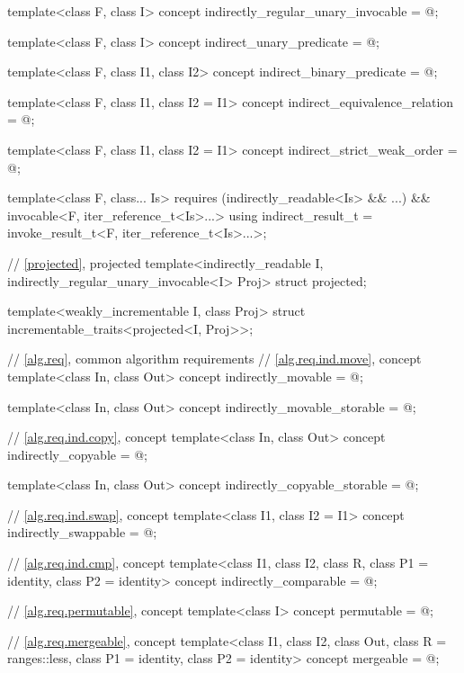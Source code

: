 \begin{codeblock}
{  template<class F, class I>
    concept indirectly_regular_unary_invocable = @\seebelow@;

  template<class F, class I>
    concept indirect_unary_predicate = @\seebelow@;

  template<class F, class I1, class I2>
    concept indirect_binary_predicate = @\seebelow@;

  template<class F, class I1, class I2 = I1>
    concept indirect_equivalence_relation = @\seebelow@;

  template<class F, class I1, class I2 = I1>
    concept indirect_strict_weak_order = @\seebelow@;

  template<class F, class... Is>
    requires (indirectly_readable<Is> && ...) && invocable<F, iter_reference_t<Is>...>
      using indirect_result_t = invoke_result_t<F, iter_reference_t<Is>...>;

  // \ref{projected}, projected
  template<indirectly_readable I, indirectly_regular_unary_invocable<I> Proj>
    struct projected;

  template<weakly_incrementable I, class Proj>
    struct incrementable_traits<projected<I, Proj>>;

  // \ref{alg.req}, common algorithm requirements
  // \ref{alg.req.ind.move}, concept 
  template<class In, class Out>
    concept indirectly_movable = @\seebelow@;

  template<class In, class Out>
    concept indirectly_movable_storable = @\seebelow@;

  // \ref{alg.req.ind.copy}, concept 
  template<class In, class Out>
    concept indirectly_copyable = @\seebelow@;

  template<class In, class Out>
    concept indirectly_copyable_storable = @\seebelow@;

  // \ref{alg.req.ind.swap}, concept 
  template<class I1, class I2 = I1>
    concept indirectly_swappable = @\seebelow@;

  // \ref{alg.req.ind.cmp}, concept 
  template<class I1, class I2, class R, class P1 = identity, class P2 = identity>
    concept indirectly_comparable = @\seebelow@;

  // \ref{alg.req.permutable}, concept 
  template<class I>
    concept permutable = @\seebelow@;

  // \ref{alg.req.mergeable}, concept 
  template<class I1, class I2, class Out,
      class R = ranges::less, class P1 = identity, class P2 = identity>
    concept mergeable = @\seebelow@;

}
\end{codeblock}
